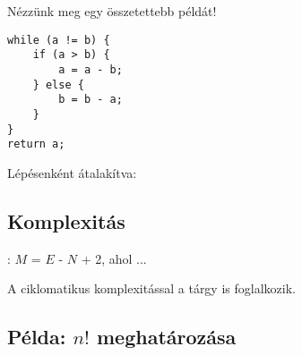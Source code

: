 Nézzünk meg egy összetettebb példát!

\begin{minipage}{\balhasab}
\begin{lstlisting}
while (a != b) {
	if (a > b) {
		a = a - b;
	} else {
		b = b - a;
	}
}
return a;
\end{lstlisting}
\end{minipage}
\begin{minipage}{\jobbhasab}
\end{minipage}


Lépésenként átalakítva:

\begin{minipage}{0.2\linewidth}
\end{minipage}
\begin{minipage}{0.35\linewidth}
\end{minipage}
\begin{minipage}{0.45\linewidth}
\end{minipage}

\subsection{Komplexitás}

\begin{definicio}
: $M$ = $E$ - $N$ + 2, ahol ...
\end{definicio}


\begin{megjegyzes}
	A ciklomatikus komplexitással a \szofttech tárgy is foglalkozik.
\end{megjegyzes}

\subsection{Példa: $n!$ meghatározása}

